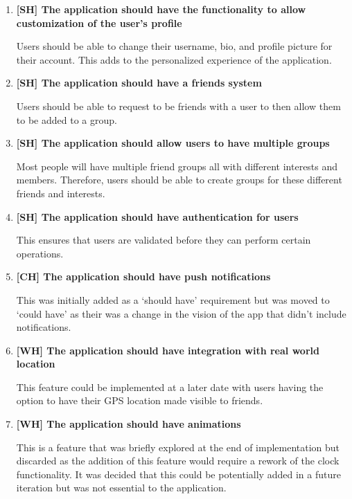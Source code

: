 \begin{enumerate}
    \item \textbf{[SH] The application should have the functionality to allow customization of the user's profile } \par
    Users should be able to change their username, bio, and profile picture for their account. This adds to the personalized experience of the application.
    \item \textbf{[SH] The application should have a friends system } \par
    Users should be able to request to be friends with a user to then allow them to be added to a group.
    \item \textbf{[SH] The application should allow users to have multiple groups } \par
    Most people will have multiple friend groups all with different interests and members. Therefore, users should be able to create groups for these different friends and interests. 
    \item \textbf{[SH] The application should have authentication for users } \par
    This ensures that users are validated before they can perform certain operations.
    \item \textbf{[CH] The application should have push notifications } \par
    This was initially added as a `should have' requirement but was moved to `could have' as their was a change in the vision of the app that didn't include notifications.
    \item \textbf{[WH] The application should have integration with real world location } \par
    This feature could be implemented at a later date with users having the option to have their GPS location made visible to friends.
    \item \textbf{[WH] The application should have animations } \par
    This is a feature that was briefly explored at the end of implementation but discarded as the addition of this feature would require a rework of the clock functionality. It was decided that this could be potentially added in a future iteration but was not essential to the application.
\end{enumerate}
